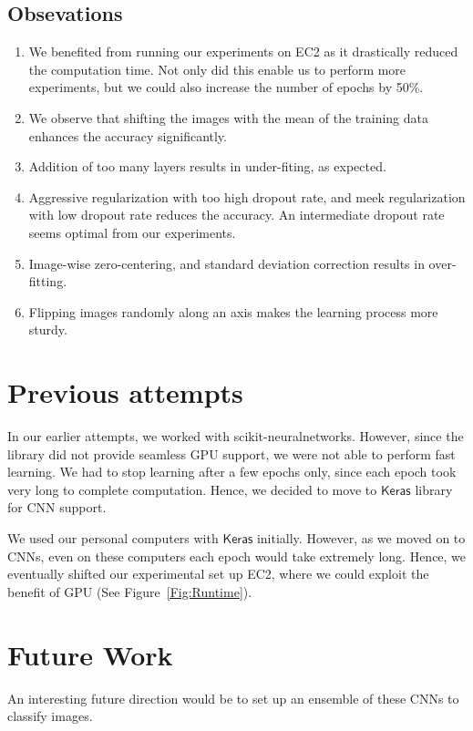 \documentclass[]{article}
\newcommand*{\keras}{\ensuremath{\mathsf{Keras}}}
\begin{document}


\subsection{Obsevations}
\begin{enumerate}
\item We benefited from running our experiments on EC2 as it drastically reduced the computation time. Not only did this enable us to perform more experiments, but we could also increase the number of epochs by 50\%.
\item We observe that shifting the images with the mean of the training data enhances the accuracy significantly.
\item Addition of too many layers results in under-fiting, as expected. 
\item Aggressive regularization with too high dropout rate, and meek regularization with low dropout rate reduces the accuracy. An intermediate dropout rate seems optimal from our experiments. 
\item Image-wise zero-centering, and standard deviation correction results in over-fitting. 
\item Flipping images randomly along an axis makes the learning process more sturdy. 
\end{enumerate}
	
\section{Previous attempts}
In our earlier attempts, we worked with scikit-neuralnetworks. However, since the library did not provide seamless GPU support, we were not able to perform fast learning. We had to stop learning after a few epochs only, since each epoch took very long to complete computation. Hence, we decided to move to $\keras$ library for CNN support. 

We used our personal computers with $\keras$ initially. However, as we moved on to CNNs, even on these computers each epoch would take extremely long. Hence, we eventually shifted our experimental set up EC2, where we could exploit the benefit of GPU (See Figure~\ref{Fig:Runtime}).


\section{Future Work}
An interesting future direction would be to set up an ensemble of these CNNs to classify images.
\end{document}
